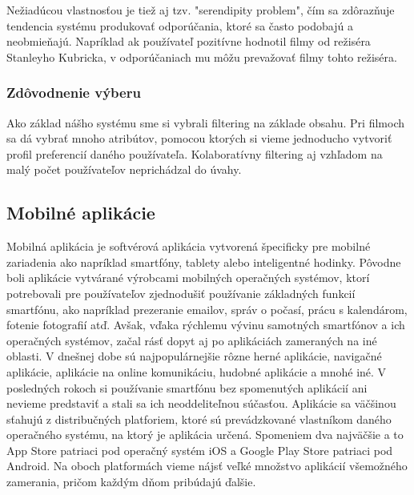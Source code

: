 Nežiadúcou vlastnosťou je tiež aj tzv. "serendipity problem", čím sa zdôrazňuje tendencia systému produkovať odporúčania, ktoré sa často podobajú a neobmieňajú. Napríklad ak používateľ pozitívne hodnotil filmy od režiséra Stanleyho Kubricka, v odporúčaniach mu môžu prevažovať filmy tohto režiséra. \cite{rs1} \\

\subsubsection{Zdôvodnenie výberu}
Ako základ nášho systému sme si vybrali filtering na základe obsahu. Pri filmoch sa dá vybrať mnoho atribútov, pomocou ktorých si vieme jednoducho vytvoriť profil preferencií daného používateľa. Kolaboratívny filtering aj vzhľadom na malý počet používateľov neprichádzal do úvahy.

\subsection{Mobilné aplikácie}
Mobilná aplikácia je softvérová aplikácia vytvorená špecificky pre mobilné zariadenia ako napríklad smartfóny, tablety alebo inteligentné hodinky. \cite{ma1} Pôvodne boli aplikácie vytvárané výrobcami mobilných operačných systémov, ktorí potrebovali pre používateľov zjednodušiť používanie základných funkcií smartfónu, ako napríklad prezeranie emailov, správ o počasí, prácu s kalendárom, fotenie fotografií atď. \cite{ma2} Avšak, vďaka rýchlemu vývinu samotných smartfónov a ich operačných systémov, začal rásť dopyt aj po aplikáciách zameraných na iné oblasti. V dnešnej dobe sú najpopulárnejšie rôzne herné aplikácie, navigačné aplikácie, aplikácie na online komunikáciu, hudobné aplikácie a mnohé iné. V posledných rokoch si používanie smartfónu bez spomenutých aplikácií ani nevieme predstaviť a stali sa ich neoddeliteľnou súčasťou. Aplikácie sa väčšinou sťahujú z distribučných platforiem, ktoré sú prevádzkované vlastníkom daného operačného systému, na ktorý je aplikácia určená. Spomeniem dva najväčšie a to App Store patriaci pod operačný systém iOS a Google Play Store patriaci pod Android. Na oboch platformách vieme nájsť veľké množstvo aplikácií všemožného zamerania, pričom každým dňom pribúdajú ďalšie. \cite{ma1} \\
